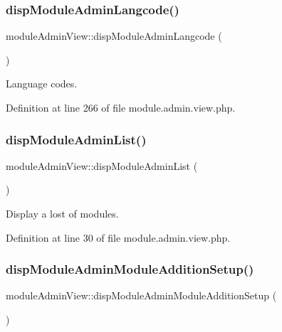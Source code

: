 \subsubsection{\texorpdfstring{disp\+Module\+Admin\+Langcode()}{dispModuleAdminLangcode()}}
{\footnotesize\ttfamily module\+Admin\+View\+::disp\+Module\+Admin\+Langcode (\begin{DoxyParamCaption}{ }\end{DoxyParamCaption})}



Language codes. 



Definition at line 266 of file module.\+admin.\+view.\+php.

\mbox{\label{classmoduleAdminView_a9fcb82dc32bc423eda912b34d0cabd00}} 
\subsubsection{\texorpdfstring{disp\+Module\+Admin\+List()}{dispModuleAdminList()}}
{\footnotesize\ttfamily module\+Admin\+View\+::disp\+Module\+Admin\+List (\begin{DoxyParamCaption}{ }\end{DoxyParamCaption})}



Display a lost of modules. 



Definition at line 30 of file module.\+admin.\+view.\+php.

\mbox{\label{classmoduleAdminView_aa880758b1a06f6ba2417311b1a1a9fc8}} 
\subsubsection{\texorpdfstring{disp\+Module\+Admin\+Module\+Addition\+Setup()}{dispModuleAdminModuleAdditionSetup()}}
{\footnotesize\ttfamily module\+Admin\+View\+::disp\+Module\+Admin\+Module\+Addition\+Setup (\begin{DoxyParamCaption}{ }\end{DoxyParamCaption})}



